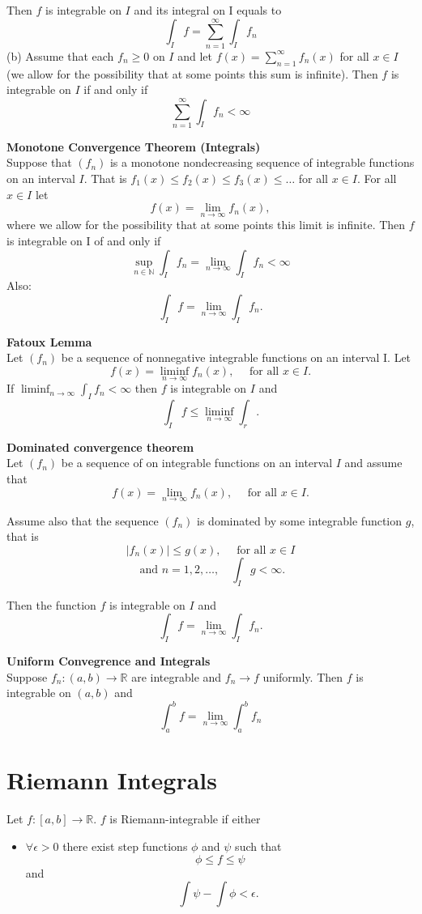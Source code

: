 \documentclass[a4paper, 10pt]{article}
\begin{document}
\begin{multicols*}{3}
Then $f$ is integrable on $I$ and its integral on I equals to
$$
\int_I f=\sum_{n=1}^{\infty} \int_I f_n
$$
(b) Assume that each $f_n \geq 0$ on $I$ and let $f(x)=\sum_{n=1}^{\infty} f_n(x)$ for all $x \in I$ (we allow for the possibility that at some points this sum is infinite). Then $f$ is integrable on $I$ if and only if
$$
\sum_{n=1}^{\infty} \int_I f_n<\infty
$$

\textbf{Monotone Convergence Theorem (Integrals)}\\
Suppose that $\left(f_n\right)$ is a monotone nondecreasing sequence of integrable functions on an interval $I$. That is $f_1(x) \leq f_2(x) \leq f_3(x) \leq \ldots$ for all $x \in I$. For all $x \in I$ let
$$
f(x)=\lim _{n \rightarrow \infty} f_n(x),
$$
where we allow for the possibility that at some points this limit is infinite. Then $f$ is integrable on I of and only if
$$
\sup _{n \in \mathbb{N}} \int_I f_n=\lim _{n \rightarrow \infty} \int_I f_n<\infty 
$$ 
Also: 
$$
\int_I f=\lim _{n \rightarrow \infty} \int_I f_n .
$$

\textbf{Fatoux Lemma}\\
Let $\left(f_n\right)$ be a sequence of nonnegative integrable functions on an interval I. Let
$$
f(x)=\liminf _{n \rightarrow \infty} f_n(x), \quad \text { for all } x \in I .
$$
If $\liminf _{n \rightarrow \infty} \int_I f_n<\infty$ then $f$ is integrable on $I$ and
$$
\int_I f \leq \liminf _{n \rightarrow \infty} \int_r .
$$

\textbf{Dominated convergence theorem}\\ 
Let $\left(f_n\right)$ be a sequence of on integrable functions on an interval $I$ and assume that
$$
f(x)=\lim _{n \rightarrow \infty} f_n(x), \quad \text { for all } x \in I .
$$

Assume also that the sequence $\left(f_n\right)$ is dominated by some integrable function $g$, that is
$$
\left|f_n(x)\right| \leq g(x), \quad \text { for all } x \in I 
$$
$$
\text { and } n=1,2, \ldots, \quad \int_I g<\infty .
$$

Then the function $f$ is integrable on $I$ and
$$
\int_I f=\lim _{n \rightarrow \infty} \int_I f_n .
$$

\textbf{Uniform Convegrence and Integrals}\\
Suppose $f_n:(a, b) \rightarrow \mathbb{R}$ are integrable and $f_n \rightarrow f$ uniformly. Then $f$ is integrable on $(a, b)$ and
$$
\int_a^b f=\lim _{n \rightarrow \infty} \int_a^b f_n
$$

\section*{Riemann Integrals}
Let $f: [a,b] \rightarrow \mathbb{R}$. $f$ is Riemann-integrable if either
\begin{itemize}[label=\textbullet, labelsep=0.3em, leftmargin=1em]
\item$\forall\epsilon>0$ there exist step functions $\phi$ and $\psi$ such that
$$
\phi \leq f \leq \psi
$$
and
$$
\int \psi-\int \phi<\epsilon \text {. }
$$


\end{itemize}
\end{multicols*}
\end{document}
